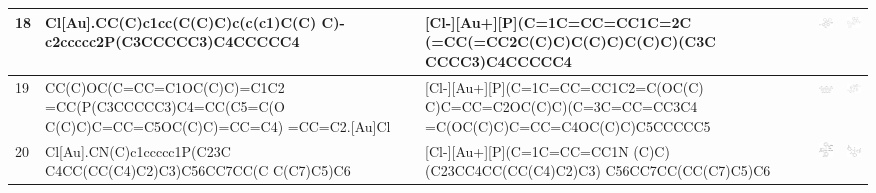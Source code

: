 \begin{landscape}
\begin{longtable}{m{0.3cm}m{6.7cm}m{7.7cm}m{2.3cm}m{2.3cm}}
 18 &
 Cl[Au].CC(C)c1cc(C(C)C)c(c(c1)C(C) C)-c2ccccc2P(C3CCCCC3)C4CCCCC4 & 
 [Cl-][Au+][P](C=1C=CC=CC1C=2C (=CC(=CC2C(C)C)C(C)C)C(C)C)(C3C CCCC3)C4CCCCC4 & 
 \includegraphics[width=2.2cm]{imagenes/sigmaAldrich/Chloro[2-dicyclohexyl(2,4,6-trisopropylbiphenyl)phosphine]gold(I).png} & 
 \includegraphics[width=2.2cm]{imagenes/sciFinder/pdf/Chloro[2-dicyclohexyl(2,4,6-trisopropylbiphenyl)phosphine]gold(I).pdf} \\
\hline



 19 &
 CC(C)OC(C=CC=C1OC(C)C)=C1C2 =CC(P(C3CCCCC3)C4=CC(C5=C(O C(C)C)C=CC=C5OC(C)C)=CC=C4) =CC=C2.[Au]Cl & 
 [Cl-][Au+][P](C=1C=CC=CC1C2=C(OC(C) C)C=CC=C2OC(C)C)(C=3C=CC=CC3C4 =C(OC(C)C)C=CC=C4OC(C)C)C5CCCCC5 & 
 \includegraphics[width=2.2cm]{imagenes/sigmaAldrich/pdf/BisPhePhos XD gold(I) chloride.pdf} & 
 \includegraphics[width=2.2cm]{imagenes/sciFinder/pdf/BisPhePhos XD gold(I) chloride.pdf} \\
\hline



 20 &
 Cl[Au].CN(C)c1ccccc1P(C23C C4CC(CC(C4)C2)C3)C56CC7CC(C C(C7)C5)C6 & 
 [Cl-][Au+][P](C=1C=CC=CC1N (C)C)(C23CC4CC(CC(C4)C2)C3) C56CC7CC(CC(C7)C5)C6 & 
 \includegraphics[width=2.2cm]{imagenes/sigmaAldrich/Chloro[di(1-adamantyl)-2-dimethylaminophenylphosphine]gold(I).png} & 
 \includegraphics[width=2.2cm]{imagenes/sciFinder/pdf/Chloro[di(1-adamantyl)-2-dimethylaminophenylphosphine]gold(I).pdf} \\
\hline






\end{longtable}
\end{landscape}
